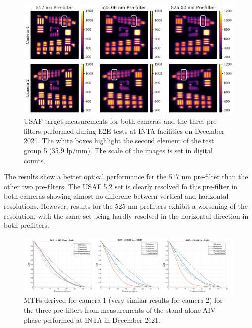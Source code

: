 \begin{figure}[t]
    \includegraphics[width=\textwidth]{figures/TuMag/USAF_E2E.pdf}
    \caption{
      USAF target measurements for both cameras and the three pre-filters performed during E2E tests at INTA facilities on December 2021. The white boxes highlight the second element of the test group 5 (35.9 lp/mm). The scale of the images is set in digital counts.}
      \label{tumag : USAF}
\end{figure}

The results show a better optical performance for the 517 nm pre-filter than the other two pre-filters. The USAF 5.2 set is clearly resolved fo this pre-filter in both cameras showing almost no differene between vertical and horizontal resolutions. However, results for the 525 nm prefilters exhibit a worsening of the resolution, with the same set being hardly resolved in the horizontal direction in both prefilters. 

\begin{figure}[t]
    \includegraphics[width=\textwidth]{figures/TuMag/mtfs.pdf}
    \caption{MTFs derived for camera 1 (very similar results for camera 2) for the three pre-filters from measurements of the stand-alone AIV phase performed at INTA in December 2021.  
      \label{fig_tumag:mtfs}}
\end{figure}



